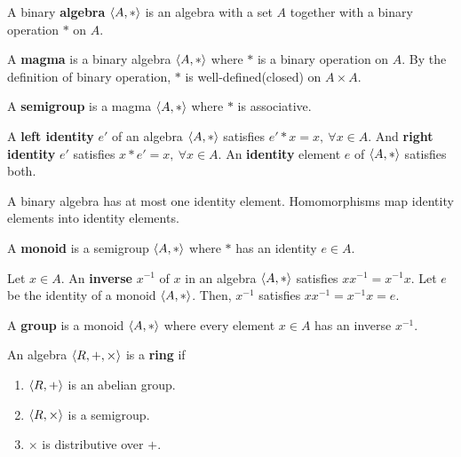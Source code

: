 \begin{definition}
	A binary \textbf{algebra} $\left\langle A,\ast \right\rangle$ is an algebra with a set $A$ together with a binary operation $\ast$ on $A$.
\end{definition}

\begin{definition}
	A \textbf{magma} is a binary algebra $\left\langle A,\ast \right\rangle$ where $\ast$ is a binary operation on $A$.
	By the definition of binary operation, $\ast$ is well-defined(closed) on $A \times A$.
\end{definition}

\begin{definition}
	A \textbf{semigroup} is a magma $\left\langle A,\ast \right\rangle$ where $\ast$ is associative.
\end{definition}

\begin{definition}
	A \textbf{left identity} $e'$ of an algebra $\left\langle A,\ast \right\rangle$ satisfies $e' \ast x = x,\ \forall x \in A$.
	And \textbf{right identity} $e'$ satisfies $x \ast e' = x,\ \forall x \in A$.
	An \textbf{identity} element $e$ of $\left\langle A,\ast \right\rangle$ satisfies both.
\end{definition}
	A binary algebra has at most one identity element.
	Homomorphisms map identity elements into identity elements.

\begin{definition}
	A \textbf{monoid} is a semigroup $\left\langle A,\ast \right\rangle$ where $\ast$ has an identity $e \in A$.
\end{definition}

\begin{definition}
	Let $x \in A$.
	An \textbf{inverse} $x^{-1}$ of $x$ in an algebra $\left\langle A,\ast \right\rangle$ satisfies $xx^{-1} = x^{-1}x$.
	Let $e$ be the identity of a monoid $\left\langle A,\ast \right\rangle$.
	Then, $x^{-1}$ satisfies $xx^{-1} = x^{-1}x = e$.
\end{definition}

\begin{definition}
	A \textbf{group} is a monoid $\left\langle A,\ast \right\rangle$ where every element $x \in A$ has an inverse $x^{-1}$.
\end{definition}

\begin{definition}
	An algebra $\left\langle R,+,\times \right\rangle$ is a \textbf{ring} if
	\begin{enumerate}
		\item $\left\langle R,+ \right\rangle$ is an abelian group.
		\item $\left\langle R,\times \right\rangle$ is a semigroup.
		\item $\times$ is distributive over $+$.
	\end{enumerate}
\end{definition}

